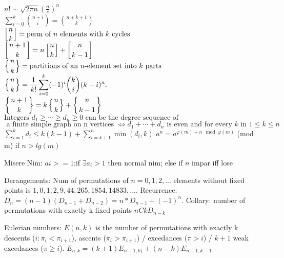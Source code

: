 $\displaystyle n!\sim {\sqrt {2\pi n}}\left({\frac {n}{e}}\right)^{n}$ \\
$\displaystyle \sum \limits_{i= 0}^k{n+i \choose i} = {n+k+1 \choose k}$ \\
${\displaystyle \left[{n \atop k}\right]} =\text{perm of }n \text{ elements with } k \text{ cycles}$ \\
${\displaystyle \left[{n+1 \atop k}\right]=n\left[{n \atop k}\right]+\left[{n \atop k-1}\right]}$ \\
${\displaystyle \left\{{n \atop k}\right\}}= \text{partitions of an }n\text{-element set into } k \text{ parts}$ \\
${\displaystyle \left\{{n \atop k}\right\}={\frac {1}{k!}}\sum _{i=0}^{k}(-1)^{i}{\binom {k}{i}}(k-i)^{n}.}$ \\
${\displaystyle \left\{{n+1 \atop k}\right\}=k\left\{{n \atop k}\right\}+\left\{{n \atop k-1}\right\}}$ \\
$\text {Integers } d_{1}\geq \cdots \geq d_{n} \geq 0 \text { can be the degree sequence of }$ \\
$\text { a finite simple graph on n vertices }\iff d_{1}+\cdots +d_{n} \text { is even and for every } k \text { in } 1\leq k\leq n $ \\
${\displaystyle \sum _{i=1}^{k}d_{i}\leq k(k-1)+\sum _{i=k+1}^{n}\min(d_{i},k)}$
$a^n = a^{\varphi(m)+n \mod \varphi(m)}$ (mod m) if $n > lg(m)$

Misere Nim: $ai>=1$;if $\exists a_i > 1$ then normal nim; else if $n$ impar iff lose

Derangements: Num of permutations of $n=0,1,2,...$ elements without fixed points is
$1,0,1,2,9,44,265,1854,14833,...$. Recurrence: $D_n = (n-1)(D_{n-1}+D_{n-2}) = n*D_{n-1}+(-1)^n$.
Collary: number of permutations with exactly k fixed points $nCk D_{n-k}$

Eulerian numbers: $E(n,k)$ is the number of permutations with exactly k descents ($i:\pi_{i} < \pi_{i+1}$),
ascents ($\pi_i > \pi_{i+1}$) / excedances ($\pi > i$) / $k+1$ weak excedances ($\pi \geq i$).
$E_{n,k} = (k+1)E_{n-1,k)} + (n-k)E_{n-1,k-1}$
